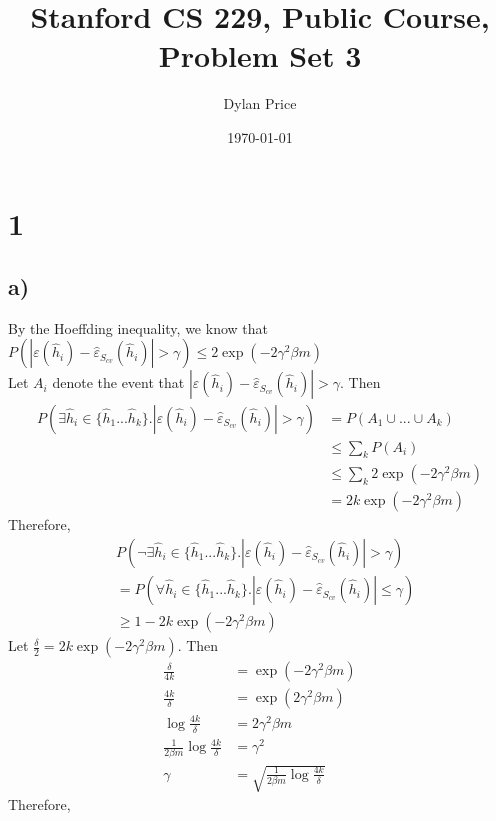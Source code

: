 \documentclass[11pt]{article}
\begin{document}
\title{Stanford CS 229, Public Course, Problem Set 3}
\date{\today}
\author{Dylan Price}
\maketitle 

\newcommand{\hhat}[1][]{\hat{h}_#1}
\newcommand{\CvtError}[0]{\hat{\varepsilon}_{S_{cv}}}
\newcommand{\GError}[0]{\varepsilon}

\section*{1}

\subsection*{a)}
By the Hoeffding inequality, we know that \\

$P(|\GError(\hhat{i}) - \CvtError(\hhat{i})| > \gamma) \le 2\exp(-2 \gamma^2 \beta m) $ \\

Let $A_i$ denote the event that $|\GError(\hhat{i}) - \CvtError(\hhat{i})| > \gamma$. Then \\
\begin{align*}
    P(\exists \hhat{i} \in \{\hhat{1}...\hhat{k}\}. |\GError(\hhat{i}) - \CvtError(\hhat{i})| > \gamma) 
        &= P(A_1 \cup ... \cup A_k) \\
        &\le \sum_k P(A_i) \\
        &\le \sum_k 2\exp(-2 \gamma^2 \beta m) \\
        &= 2k \exp(-2 \gamma^2 \beta m)
\end{align*}
Therefore, \begin{align*}
    &P(\neg \exists \hhat{i} \in \{\hhat{1}...\hhat{k}\}. |\GError(\hhat{i}) - \CvtError(\hhat{i})| > \gamma) \\
    &= P(\forall \hhat{i} \in \{\hhat{1}...\hhat{k}\}. |\GError(\hhat{i}) - \CvtError(\hhat{i})| \le \gamma) \\
    &\geq 1 - 2k\exp(-2 \gamma^2 \beta m)
\end{align*}
Let $\frac{\delta}{2} = 2k\exp(-2 \gamma^2 \beta m)$. Then
\begin{align*}
                          \frac{\delta}{4k} &= \exp(-2 \gamma^2 \beta m) \\
                          \frac{4k}{\delta} &= \exp(2 \gamma^2 \beta m) \\
                     \log \frac{4k}{\delta} &= 2 \gamma^2 \beta m \\
 \frac{1}{2 \beta m} \log \frac{4k}{\delta} &= \gamma^2 \\
                                     \gamma &= \sqrt{\frac{1}{2 \beta m} \log \frac{4k}{\delta}}
\end{align*}
Therefore,
\end{document}
